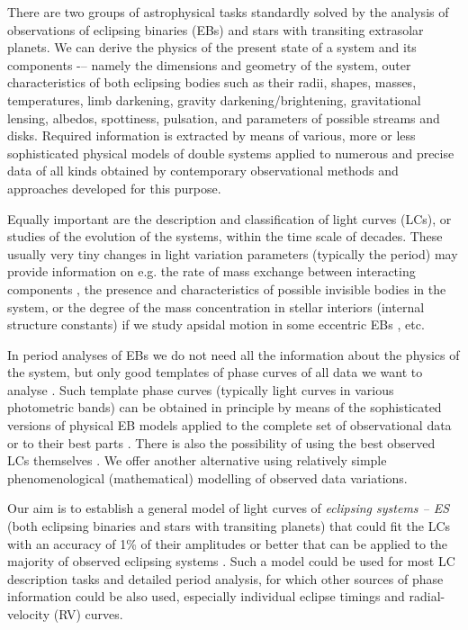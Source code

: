 \documentclass{aa}
\begin{document}
There are two groups of astrophysical tasks standardly solved by the analysis of observations of eclipsing binaries (EBs) and stars with transiting extrasolar planets. We can derive the physics of the present state of a system and its components -– namely the dimensions and geometry of the system, outer characteristics of both eclipsing bodies such as their radii, shapes, masses, temperatures, limb darkening, gravity darkening/brightening, gravitational lensing, albedos, spottiness, pulsation, and parameters of possible streams and disks. Required information is extracted by means of various, more or less sophisticated physical models of double systems \citep[e.g.][]{wilson,kalmil,had,BM3,prsa05,prsa11,prib12} applied to numerous and precise data of all kinds obtained by contemporary observational methods and approaches developed for this purpose.

Equally important are the description and classification of light curves (LCs), or studies of the evolution of the systems, within the time scale of decades. These usually very tiny changes in light variation parameters (typically the period) may provide information on e.g. the rate of mass exchange between interacting components \citep[e.g.][]{zhudd,zhubs,miktatry}, the presence and characteristics of possible invisible bodies \citep[stars, planets, e.g.][]{van,qian3} in the system, or the degree of the mass concentration in stellar interiors (internal structure constants) if we study apsidal motion in some eccentric EBs \citep[e.g.][]{kopal,claret,zasche13}, etc.

In period analyses of EBs we do not need all the information about the physics of the system, but only good templates of phase curves of all data we want to analyse \citep{miktatry}. Such template phase curves (typically light curves in various photometric bands) can be obtained in principle by means of the sophisticated versions of physical EB models applied to the complete set of observational data \citep[see in][]{van,wilson14} or to their best parts \citep[e.g.][]{zasche14,zasche15}.  There is also the possibility of using the best observed LCs themselves \citep{pribulla}.
We offer another alternative using relatively simple phenomenological (mathematical) modelling of observed data variations.

Our aim is to establish a general model of light curves of \textit{eclipsing systems -- ES} (both eclipsing binaries and stars with transiting planets) that could fit the LCs with an accuracy of 1\% of their amplitudes or better that can be applied to the majority of observed eclipsing systems \citep[the concept of the model is outlined in][]{mikcon}. Such a model could be used for most LC description tasks and detailed period analysis, for which other sources of phase information could be also used, especially individual eclipse timings and radial-velocity (RV) curves.
\end{document}
